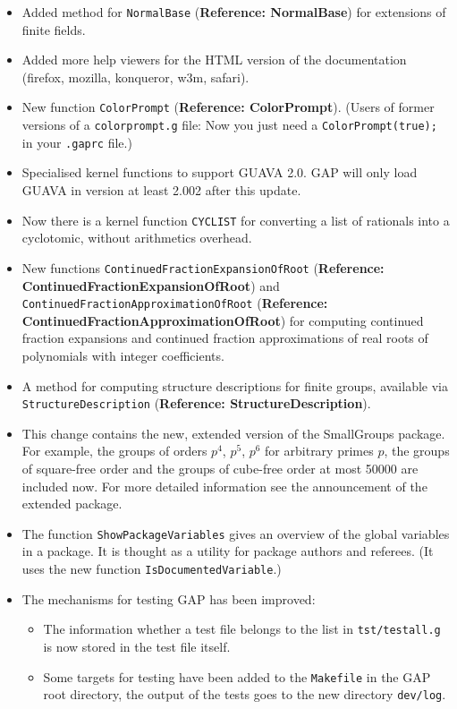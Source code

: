 \documentclass[a4paper,11pt]{report}
\begin{document}
{{\begin{itemize}
\item  Added method for \texttt{NormalBase} (\textbf{Reference: NormalBase}) for extensions of finite fields. 
\item  Added more help viewers for the HTML version of the documentation (firefox,
mozilla, konqueror, w3m, safari). 
\item  New function \texttt{ColorPrompt} (\textbf{Reference: ColorPrompt}). (Users of former versions of a \texttt{colorprompt.g} file: Now you just need a \texttt{ColorPrompt(true);} in your \texttt{.gaprc} file.) 
\item  Specialised kernel functions to support \textsf{GUAVA} 2.0. \textsf{GAP} will only load \textsf{GUAVA} in version at least 2.002 after this update. 
\item  Now there is a kernel function \texttt{CYC{\textunderscore}LIST} for converting a list of rationals into a cyclotomic, without arithmetics
overhead. 
\item  New functions \texttt{ContinuedFractionExpansionOfRoot} (\textbf{Reference: ContinuedFractionExpansionOfRoot}) and \texttt{ContinuedFractionApproximationOfRoot} (\textbf{Reference: ContinuedFractionApproximationOfRoot}) for computing continued fraction expansions and continued fraction
approximations of real roots of polynomials with integer coefficients. 
\item  A method for computing structure descriptions for finite groups, available via \texttt{StructureDescription} (\textbf{Reference: StructureDescription}). 
\item  This change contains the new, extended version of the \textsf{SmallGroups} package. For example, the groups of orders $p^4$, $p^5$, $p^6$ for arbitrary primes $p$, the groups of square-free order and the groups of cube-free order at most
50000 are included now. For more detailed information see the announcement of
the extended package. 
\item  The function \texttt{ShowPackageVariables} gives an overview of the global variables in a package. It is thought as a
utility for package authors and referees. (It uses the new function \texttt{IsDocumentedVariable}.) 
\item  The mechanisms for testing \textsf{GAP} has been improved: 
\begin{itemize}
\item  The information whether a test file belongs to the list in \texttt{tst/testall.g} is now stored in the test file itself.
\item  Some targets for testing have been added to the \texttt{Makefile} in the \textsf{GAP} root directory, the output of the tests goes to the new directory \texttt{dev/log}.

\end{itemize}
\end{itemize}}}
\end{document}
